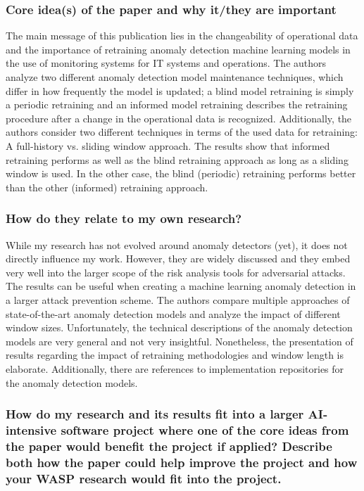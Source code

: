 \documentclass[11pt]{article}
\begin{document}
\subsubsection{Core idea(s) of the paper and why it/they are important}

The main message of this publication lies in the changeability of operational data and the importance of retraining anomaly detection machine learning models in the use of monitoring systems for IT systems and operations. 
The authors analyze two different anomaly detection model maintenance techniques, which differ in how frequently the model is updated; a blind model retraining is simply a periodic retraining and an informed model retraining describes the retraining procedure after a change in the operational data is recognized. 
Additionally, the authors consider two different techniques in terms of the used data for retraining: A full-history vs. sliding window approach. 
The results show that informed retraining performs as well as the blind retraining approach as long as a sliding window is used. In the other case, the blind (periodic) retraining performs better than the other (informed) retraining approach. 

\subsubsection{How do they relate to my own research?}

While my research has not evolved around anomaly detectors (yet), it does not directly influence my work. However, they are widely discussed and they embed very well into the larger scope of the risk analysis tools for adversarial attacks. 
The results can be useful when creating a machine learning anomaly detection in a larger attack prevention scheme. The authors compare multiple approaches of state-of-the-art anomaly detection models and analyze the impact of different window sizes. 
Unfortunately, the technical descriptions of the anomaly detection models are very general and not very insightful. Nonetheless, the presentation of results regarding the impact of retraining methodologies and window length is elaborate. Additionally, there are references to implementation repositories for the anomaly detection models.

\subsubsection{How do my research and its results fit into a larger AI-intensive software project where one of the core ideas from the paper would benefit the project if applied? Describe both how the paper could help improve the project and how your WASP research would fit into the project.}
\end{document}
